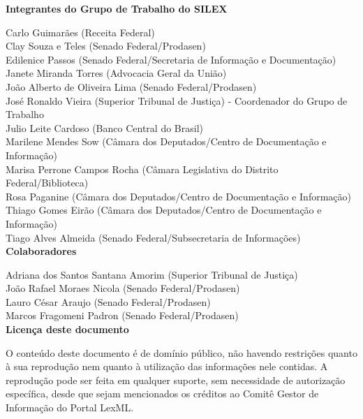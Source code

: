 \documentclass[a4paper,11pt,openright,twoside,english,brazil]{abntex2}
\begin{document}
\frenchspacing 



\imprimircapa

\imprimirfolhaderosto*

\vspace*{\fill}
{
\setlength{\parindent}{0cm}

\ABNTEXchapterfont

\textbf{Integrantes do Grupo de Trabalho do SILEX} 

Carlo Guimarães (Receita Federal) \\
Clay Souza e Teles (Senado Federal/Prodasen) \\
Edilenice Passos (Senado Federal/Secretaria de Informação e Documentação) \\
Janete Miranda Torres (Advocacia Geral da União) \\
João Alberto de Oliveira Lima (Senado Federal/Prodasen) \\
José Ronaldo Vieira (Superior Tribunal de Justiça) - Coordenador do Grupo de
Trabalho \\
Julio Leite Cardoso (Banco Central do Brasil) \\
Marilene Mendes Sow (Câmara dos Deputados/Centro de Documentação e Informação)
\\
Marisa Perrone Campos Rocha (Câmara Legislativa do Distrito Federal/Biblioteca)
\\
Rosa Paganine (Câmara dos Deputados/Centro de Documentação e Informação) \\
Thiago Gomes Eirão (Câmara dos Deputados/Centro de Documentação e Informação) \\
Tiago Alves Almeida (Senado Federal/Subsecretaria de Informações) \\

\textbf{Colaboradores}

Adriana dos Santos Santana Amorim (Superior Tribunal de Justiça) \\
João Rafael Moraes Nicola (Senado Federal/Prodasen) \\
Lauro César Araujo (Senado Federal/Prodasen) \\
Marcos Fragomeni Padron (Senado Federal/Prodasen) \\

\textbf{Licença deste documento}

O conteúdo deste documento é de domínio público, não havendo restrições quanto à sua
reprodução nem quanto à utilização das informações nele contidas. A reprodução pode ser feita
em qualquer suporte, sem necessidade de autorização específica, desde que sejam mencionados
os créditos ao Comitê Gestor de Informação do Portal LexML. 
}
\vspace*{\fill}
\end{document}
